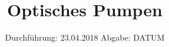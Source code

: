 

\subject{V21}
\title{Optisches Pumpen}
\date{
  Durchführung: 23.04.2018
  \hspace{3em}
  Abgabe: DATUM
}



\maketitle
\thispagestyle{empty}
\tableofcontents
\newpage


\clearpage
\newpage

\clearpage
\newpage

\clearpage
\newpage

\clearpage
\newpage

\clearpage
\newpage

\clearpage
\newpage

\printbibliography

\clearpage
\newpage





%
%
%     
%

